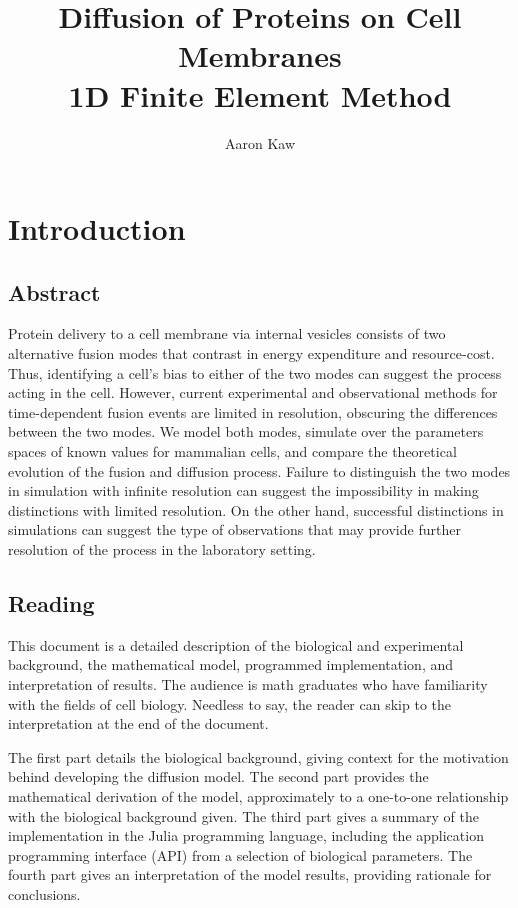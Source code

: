 \documentclass{report}
\title{Diffusion of Proteins on Cell Membranes \\ 1D Finite Element Method}
\author{Aaron Kaw}
\date{}
\begin{document}
\maketitle
\tableofcontents

\chapter{Introduction}
\section{Abstract}
Protein delivery to a cell membrane via internal vesicles consists of two alternative fusion modes that contrast in energy expenditure and resource-cost. Thus, identifying a cell's bias to either of the two modes can suggest the process acting in the cell. However, current experimental and observational methods for time-dependent fusion events are limited in resolution, obscuring the differences between the two modes. We model both modes, simulate over the parameters spaces of known values for mammalian cells, and compare the theoretical evolution of the fusion and diffusion process. Failure to distinguish the two modes in simulation with infinite resolution can suggest the impossibility in making distinctions with limited resolution. On the other hand, successful distinctions in simulations can suggest the type of observations that may provide further resolution of the process in the laboratory setting.

\section{Reading}
This document is a detailed description of the biological and experimental background, the mathematical model, programmed implementation, and interpretation of results. The audience is math graduates who have familiarity with the fields of cell biology. Needless to say, the reader can skip to the interpretation at the end of the document.

The first part details the biological background, giving context for the motivation behind developing the diffusion model.
The second part provides the mathematical derivation of the model, approximately to a one-to-one relationship with the biological background given.
The third part gives a summary of the implementation in the Julia programming language, including the application programming interface (API) from a selection of biological parameters.
The fourth part gives an interpretation of the model results, providing rationale for conclusions.
\end{document}

